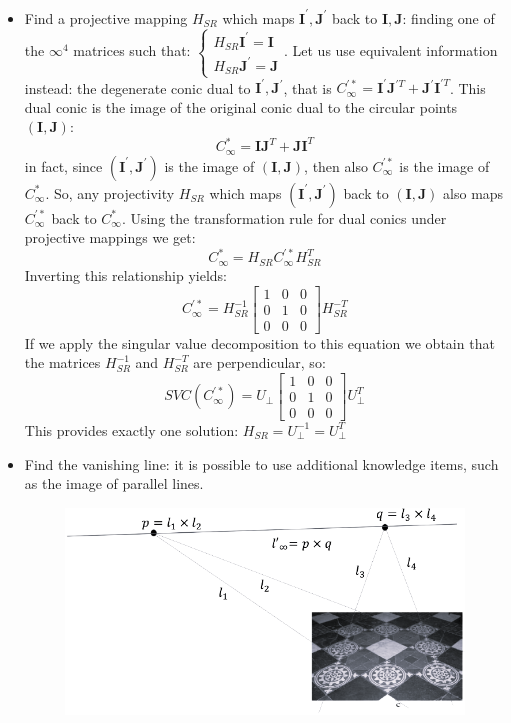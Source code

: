 \documentclass[12pt, a4paper]{report}
\newtheorem[style=M,bodystyle=\normalfont]{theorem}{Theorem}
\newtheorem[style=M,bodystyle=\normalfont]{corollary}{Corollary}
\newtheorem[style=M,bodystyle=\normalfont]{lemma}{Lemma}
\newtheorem[style=M,bodystyle=\normalfont]{definition}{Definition}
\begin{document}
    \begin{itemize}
        \item Find a projective mapping $H_{SR}$ which maps $\boldsymbol{I}^{'},\boldsymbol{J}^{'}$ back to 
            $\boldsymbol{I},\boldsymbol{J}$: finding one of the $\infty^{4}$ matrices such that: 
            $\begin{cases}
                H_{SR}\boldsymbol{I}^{'}=\boldsymbol{I} \\
                H_{SR}\boldsymbol{J}^{'}=\boldsymbol{J}
            \end{cases}$. Let us use equivalent information instead: the degenerate conic dual to $\boldsymbol{I}^{'},\boldsymbol{J}^{'}$, 
            that is $C_{\infty}^{'*}=\boldsymbol{I}^{'}\boldsymbol{J}^{'T}+\boldsymbol{J}^{'}\boldsymbol{I}^{'T}$. This dual conic is the 
            image of the original conic dual to the circular points $(\boldsymbol{I},\boldsymbol{J})$: 
            \[C_{\infty}^{*}=\boldsymbol{I}\boldsymbol{J}^{T}+\boldsymbol{J}\boldsymbol{I}^{T}\]
            in fact, since $(\boldsymbol{I}^{'},\boldsymbol{J}^{'})$ is the image of $(\boldsymbol{I},\boldsymbol{J})$, then also 
            $C_{\infty}^{'*}$ is the image of $C_{\infty}^{*}$. So, any projectivity $H_{SR}$ which maps $(\boldsymbol{I}^{'},\boldsymbol{J}^{'})$
            back to $(\boldsymbol{I},\boldsymbol{J})$ also maps $C_{\infty}^{'*}$ back to $C_{\infty}^{*}$. Using the transformation rule for dual 
            conics under projective mappings we get: 
            \[C^{*}_{\infty}=H_{SR}C^{'*}_{\infty}H_{SR}^T\]
            Inverting this relationship yields: 
            \[C_{\infty}^{'*}=H_{SR}^{-1} 
            \begin{bmatrix}
                1 & 0 & 0 \\
                0 & 1 & 0 \\
                0 & 0 & 0
            \end{bmatrix}
            H_{SR}^{-T}\]
            If we apply the singular value decomposition to this equation we obtain that the matrices $H_{SR}^{-1}$ and $H_{SR}^{-T}$ are
            perpendicular, so: 
            \[SVC(C_{\infty}^{'*})=U_\perp
            \begin{bmatrix}
                1 & 0 & 0 \\
                0 & 1 & 0 \\
                0 & 0 & 0
            \end{bmatrix}
            U_{\perp}^T\]
            This provides exactly one solution: $H_{SR}=U_{\perp}^{-1}=U_{\perp}^T$
        \item Find the vanishing line: it is possible to use additional knowledge items, such as the image of parallel lines. 
            \begin{figure}[H]
                \centering
                \includegraphics[width=0.5\linewidth]{images/van.png}
            \end{figure}
    \end{itemize}
\end{document}
